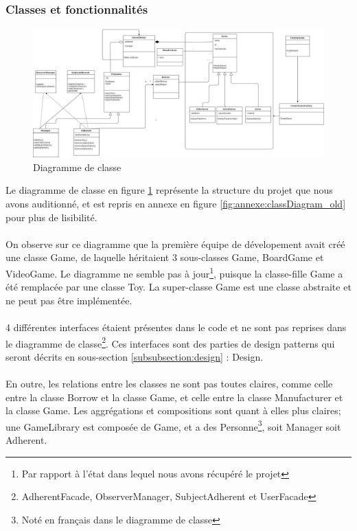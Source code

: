     \subsubsection{Classes et fonctionnalités}
        \begin{figure}[h!]
                \centering
                \includegraphics[width=\textwidth,center]{Figures/Class_Diagram.jpg}
                \caption{Diagramme de classe}
                \label{fig:classDiagram_old}
            \end{figure}
        \newpage
        Le diagramme de classe en figure \ref{fig:classDiagram_old} représente la structure du projet que nous avons auditionné, et est repris en annexe en figure \ref{fig:annexe:classDiagram_old} pour plus de lisibilité.  
        \paragraph{}
        On observe sur ce diagramme que la première équipe de dévelopement avait créé une classe Game, de laquelle héritaient 3 sous-classes Game, BoardGame et VideoGame. Le diagramme ne semble pas à jour\footnote{Par rapport à l'état dans lequel nous avons récupéré le projet}, puisque la classe-fille Game a été remplacée par une classe Toy. 
        La super-classe Game est une classe abstraite et ne peut pas être implémentée.
        \paragraph{}
        4 différentes interfaces étaient présentes dans le code et ne sont pas reprises dans le diagramme de classe\footnote{AdherentFacade, ObserverManager, SubjectAdherent et UserFacade}. Ces interfaces sont des parties de design patterns qui seront décrits en sous-section \ref{subsubsection:design} : Design.
        \paragraph{}
        En outre, les relations entre les classes ne sont pas toutes claires, comme celle entre la classe Borrow et la classe Game, et celle entre la classe Manufacturer et la classe Game. Les aggrégations et compositions sont quant à elles plus claires; une GameLibrary est composée de Game, et a des Personne\footnote{Noté en français dans le diagramme de classe}, soit Manager soit Adherent.  
